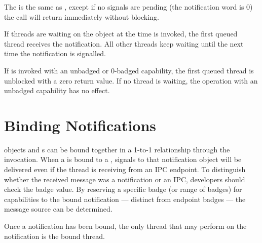 The  is the same as , except if 
no signals are pending (the notification word is 0) the call will return immediately
without blocking.

If threads are waiting on the  object at the time
 is invoked, the first queued thread
receives the notification. All other threads keep waiting until the
next time the notification is signalled. 

If  is invoked with an unbadged or 0-badged
capability, the first queued thread is unblocked with a zero return value. If
no thread is waiting, the  operation with
an unbadged capability has no effect.


\section{Binding Notifications}
\label{sec:notification-binding}

 objects and s can be bound together in a 1-to-1 relationship
through the  invocation. When a
 is bound to a , signals to that notification object
will be delivered even if the thread is receiving from an IPC
endpoint. To distinguish whether the received message was a notification
or an IPC, developers should check the badge value. By reserving a
specific badge (or range of badges) for capabilities to the bound
notification --- distinct from endpoint badges --- the
message source can be determined.

Once a notification has been bound, the only thread that may perform
 on the notification is the bound thread.
